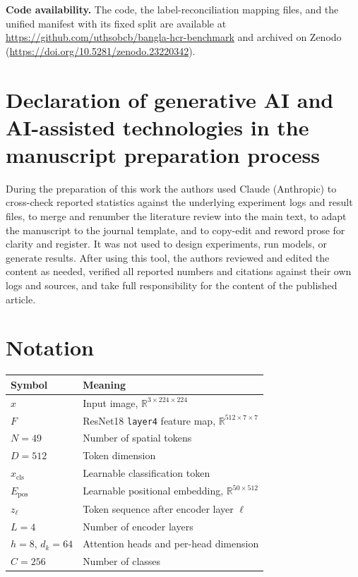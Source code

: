 \textbf{Code availability.} The code, the label-reconciliation mapping files, and the unified manifest with its fixed split are available at \url{https://github.com/uthsobcb/bangla-hcr-benchmark} and archived on Zenodo \citep{chakraborty2026bangla} (\url{https://doi.org/10.5281/zenodo.23220342}).

\section*{Declaration of generative AI and AI-assisted technologies in the manuscript preparation process}

During the preparation of this work the authors used Claude (Anthropic) to cross-check reported statistics against the underlying experiment logs and result files, to merge and renumber the literature review into the main text, to adapt the manuscript to the journal template, and to copy-edit and reword prose for clarity and register. It was not used to design experiments, run models, or generate results. After using this tool, the authors reviewed and edited the content as needed, verified all reported numbers and citations against their own logs and sources, and take full responsibility for the content of the published article.


\appendix
\hypertarget{appendix-a.-notation}{%
\section{Notation}\label{appendix-a.-notation}}

\begin{center}
\footnotesize
\begin{tabular}{>{\raggedright\arraybackslash}p{}
  >{\raggedright\arraybackslash}p{}}
\toprule
\begin{minipage}[b]{\linewidth}\raggedright
Symbol
\end{minipage} & \begin{minipage}[b]{\linewidth}\raggedright
Meaning
\end{minipage} \\
\midrule
\(x\) & Input image, \(\mathbb{R}^{3 \times 224 \times 224}\) \\
\(F\) & ResNet18 \texttt{layer4} feature map,
\(\mathbb{R}^{512 \times 7 \times 7}\) \\
\(N = 49\) & Number of spatial tokens \\
\(D = 512\) & Token dimension \\
\(x_{\text{cls}}\) & Learnable classification token \\
\(E_{\text{pos}}\) & Learnable positional embedding,
\(\mathbb{R}^{50 \times 512}\) \\
\(z_\ell\) & Token sequence after encoder layer \(\ell\) \\
\(L = 4\) & Number of encoder layers \\
\(h = 8\), \(d_k = 64\) & Attention heads and per-head dimension \\
\(C = 256\) & Number of classes \\
\bottomrule
\end{tabular}
\end{center}



